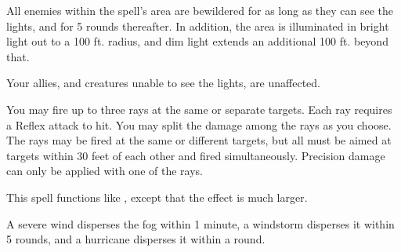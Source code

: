 \spelldur{\durshort}
\begin{spelleffect}
    All enemies within the spell's area are bewildered for as long as they can see the lights, and for 5 rounds thereafter. In addition, the area is illuminated in bright light out to a 100 ft. radius, and dim light extends an additional 100 ft. beyond that.
\end{spelleffect}
\begin{spellnotes}
    Your allies, and creatures unable to see the lights, are unaffected.
\end{spellnotes}

\begin{spelleffect}
    You may fire up to three rays at the same or separate targets. Each ray requires a Reflex attack to hit. You may split the damage among the rays as you choose. The rays may be fired at the same or different targets, but all must be aimed at targets within 30 feet of each other and fired simultaneously. Precision damage can only be applied with one of the rays.
\end{spelleffect}

\begin{spelleffect}
    This spell functions like , except that the effect is much larger.
\end{spelleffect}
\begin{spellnotes}
    A severe wind disperses the fog within 1 minute, a windstorm disperses it within 5 rounds, and a hurricane disperses it within a round.
\end{spellnotes}

